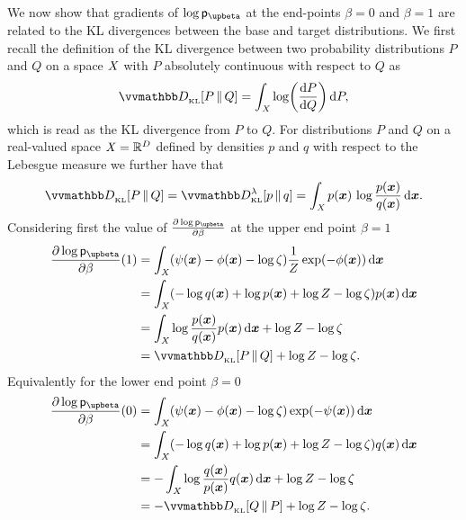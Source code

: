We now show that gradients of $\log\pden{\upbeta}$ at the end-points $\beta=0$ and $\beta=1$ are related to the \ac{KL} divergences between the base and target distributions. We first recall the definition of the \ac{KL} divergence between two probability distributions $P$ and $Q$ on a space $\mathit{X}$ with $P$ absolutely continuous with respect to $Q$ as
\begin{equation}\label{eq:kullback-leibler-probability-measures-ct}
  \kldiv{P}{Q} =
  \int_{\set{X}} \log\lpa\td{P}{Q}\rpa \,\dr P,
\end{equation}
which is read as the \ac{KL} divergence from $P$ to $Q$. For distributions $P$ and $Q$ on a real-valued space $\mathit{X} = \mathbb{R}^D$ defined by densities $p$ and $q$ with respect to the Lebesgue measure we further have that
\begin{equation}\label{eq:kullback-leibler-probability-densities-ct}
  \kldiv{P}{Q} = \kldiv[\lambda]{p}{q} =
  \int_{\set{X}} p(\vct{x}) \, \log\frac{p(\vct{x})}{q(\vct{x})} \, \dr\vct{x}.
\end{equation}
Considering first the value of $\pd{\log\pden{\upbeta}}{\beta}$ at the upper end point $\beta=1$
\begin{align}
  \pd{\log\pden{\upbeta}}{\beta}(1) &= 
  \int_{\set{X}} 
  \lpa \psi(\vct{x}) - \phi(\vct{x}) - \log\zeta \rpa \frac{1}{Z}\exp\lpa-\phi(\vct{x})\rpa
  \,\dr\vct{x}\\
  &=
  \int_{\set{X}}
  \lpa -\log q(\vct{x}) +\log \tgtdens(\vct{x}) +\log Z - \log\zeta \rpa
  \tgtdens(\vct{x})
  \,\dr\vct{x}\\
  &=
  \int_{\set{X}} 
    \log\frac{\tgtdens(\vct{x})}{q(\vct{x})} \tgtdens(\vct{x}) 
  \,\dr\vct{x} + \log Z - \log\zeta \\
  &=
  \kldiv{\tgtprob}{Q} + \log Z - \log\zeta.
\end{align}
Equivalently for the lower end point $\beta=0$
\begin{align}
  \pd{\log\pden{\upbeta}}{\beta}(0) &= 
  \int_{\set{X}} 
  \lpa \psi(\vct{x}) - \phi(\vct{x}) - \log\zeta \rpa \exp\lpa-\psi(\vct{x})\rpa
  \,\dr\vct{x}\\
  &=
  \int_{\set{X}}
  \lpa -\log q(\vct{x}) +\log \tgtdens(\vct{x}) +\log Z - \log\zeta \rpa
  q(\vct{x})
  \,\dr\vct{x}\\
  &=
  -\int_{\set{X}} 
    \log\frac{q(\vct{x})}{\tgtdens(\vct{x})} q(\vct{x}) 
  \,\dr\vct{x} + \log Z - \log\zeta \\
  &=
  -\kldiv{Q}{\tgtprob} + \log Z - \log\zeta.
\end{align}

